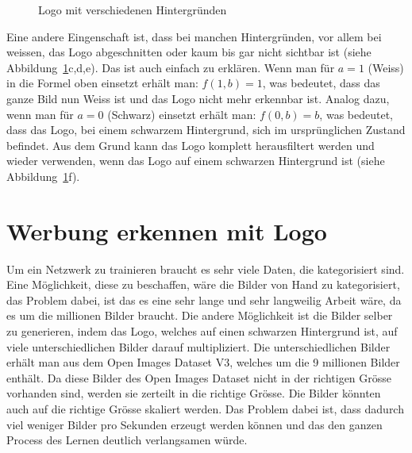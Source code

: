 \documentclass[12pt,a4paper]{report}
\begin{document}
\begin{figure}[h]
    \qquad
    \qquad
    \caption{Logo mit verschiedenen Hintergründen}%
    \label{fig:logo5}%
\end{figure}
Eine andere Eingenschaft ist, dass bei manchen Hintergründen,
vor allem bei weissen, das Logo abgeschnitten oder kaum bis gar nicht sichtbar ist (siehe Abbildung~\ref{fig:logo5}c,d,e).
Das ist auch einfach zu erklären.
Wenn man für $a = 1$ (Weiss) in die Formel oben einsetzt erhält man: $f(1, b) = 1$, was bedeutet, dass das ganze Bild nun Weiss ist und das Logo nicht mehr erkennbar ist.
Analog dazu, wenn man für $a = 0$ (Schwarz) einsetzt erhält man: $f(0, b) = b$, was bedeutet, dass das Logo, bei einem schwarzem Hintergrund,
sich im ursprünglichen Zustand befindet.
Aus dem Grund kann das Logo komplett herausfiltert werden und wieder verwenden, wenn das Logo auf einem schwarzen Hintergrund ist (siehe Abbildung~\ref{fig:logo5}f).

\section{Werbung erkennen mit Logo}
Um ein Netzwerk zu trainieren braucht es sehr viele Daten, die kategorisiert sind.
Eine Möglichkeit, diese zu beschaffen, wäre die Bilder von Hand zu kategorisiert, das Problem dabei, ist das es eine sehr lange und sehr langweilig Arbeit wäre,
da es um die millionen Bilder braucht.
Die andere Möglichkeit ist die Bilder selber zu generieren,
indem das Logo, welches auf einen schwarzen Hintergrund ist, auf viele unterschiedlichen Bilder darauf multipliziert.
Die unterschiedlichen Bilder erhält man aus dem Open Images Dataset V3\cite{openimages}, welches um die 9 millionen Bilder enthält.
Da diese Bilder des Open Images Dataset nicht in der richtigen Grösse vorhanden sind, werden sie zerteilt in die richtige Grösse.
Die Bilder könnten auch auf die richtige Grösse skaliert werden.
Das Problem dabei ist, dass dadurch viel weniger Bilder pro Sekunden erzeugt werden können und das den ganzen Process des Lernen deutlich verlangsamen würde.
\end{document}

